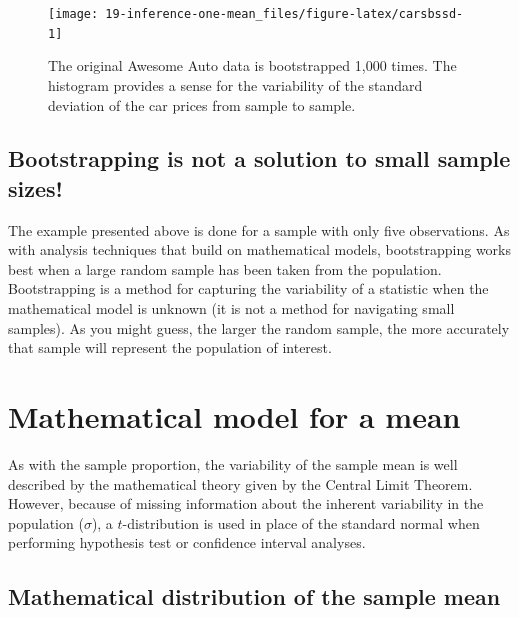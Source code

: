 \documentclass[
  10pt,
  openany]{book}
\begin{document}
\begin{figure}[h]

{\centering \texttt{[image: 19-inference-one-mean\_files/figure-latex/carsbssd-1]} 

}

\caption{The original Awesome Auto data is bootstrapped 1,000 times. The histogram provides a sense for the variability of the standard deviation of the car prices from sample to sample.}\label{fig:carsbssd}
\end{figure}

\hypertarget{bootstrapping-is-not-a-solution-to-small-sample-sizes}{%
\subsection{Bootstrapping is not a solution to small sample sizes!}\label{bootstrapping-is-not-a-solution-to-small-sample-sizes}}

The example presented above is done for a sample with only five observations.
As with analysis techniques that build on mathematical models, bootstrapping works best when a large random sample has been taken from the population.
Bootstrapping is a method for capturing the variability of a statistic when the mathematical model is unknown (it is not a method for navigating small samples).
As you might guess, the larger the random sample, the more accurately that sample will represent the population of interest.

\hypertarget{one-mean-math}{%
\section{Mathematical model for a mean}\label{one-mean-math}}

As with the sample proportion, the variability of the sample mean is well described by the mathematical theory given by the Central Limit Theorem.
However, because of missing information about the inherent variability in the population (\(\sigma\)), a \(t\)-distribution is used in place of the standard normal when performing hypothesis test or confidence interval analyses.

\hypertarget{mathematical-distribution-of-the-sample-mean}{%
\subsection{Mathematical distribution of the sample mean}\label{mathematical-distribution-of-the-sample-mean}}
\end{document}
